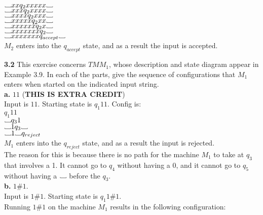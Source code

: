 \documentclass[12pt]{article}
\newcommand\Vtextvisiblespace[1][.8em]{%
	\mbox{\kern.07em\vrule height.3ex}%
	\vbox{\hrule width#1}%
	\hbox{\vrule height.3ex}}
\begin{document}
$\Vtextvisiblespace xx        q_2 xxxxx   \Vtextvisiblespace  $  \\
$\Vtextvisiblespace xxx       q_2 xxxx    \Vtextvisiblespace  $  \\
$\Vtextvisiblespace xxxx      q_2 xxx     \Vtextvisiblespace  $  \\
$\Vtextvisiblespace xxxxx     q_2 xx      \Vtextvisiblespace  $  \\
$\Vtextvisiblespace xxxxxx    q_2 x       \Vtextvisiblespace  $  \\
$\Vtextvisiblespace xxxxxxx   q_2         \Vtextvisiblespace  $  \\
$\Vtextvisiblespace xxxxxxx   q_{accept}  \Vtextvisiblespace  $  \\
$M_2$ enters into the $q_{accept}$ state, and as a result the input is accepted. \\

\pagebreak

\textbf{3.2} This exercise concerns $TM M_1$, whose description and state diagram appear in 
Example 3.9. In each of the parts, give the sequence of configurations that $M_1$ 
enters when started on the indicated input string. \\

\textbf{a.} $11$ (\textbf{THIS IS EXTRA CREDIT}) \\

Input is $11$. Starting state is $q_1 11$. Config is: \\

$      q_1 11$ \\
$ \Vtextvisiblespace q_3 1 $ \\
$ \Vtextvisiblespace 1 q_3 \Vtextvisiblespace $ \\
$ \Vtextvisiblespace 1 \Vtextvisiblespace q_{reject} $ \\
$M_1$ enters into the $q_{reject}$ state, and as a result the input is rejected. \\

The reason for this is because there is no path for the machine $M_1$ to take at
$q_3$ that involves a 1. It cannot go to $q_4$ without having a 0, and it cannot
go to $q_5$ without having a $\Vtextvisiblespace$ before the $q_3$. \\

\textbf{b.} $1\#1$. \\

Input is $1\#1$. Starting state is $q_1 1\#1$. \\
Running $1\#1$ on the machine $M_1$ results in the following configuration: \\
\end{document}
